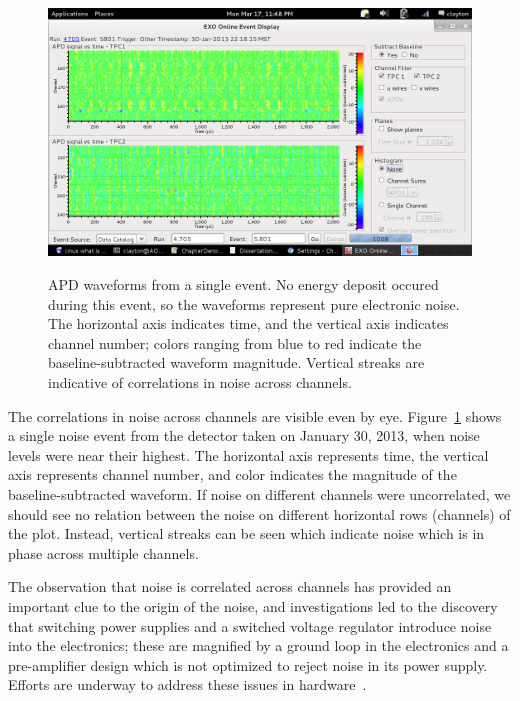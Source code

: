 \begin{figure}
\begin{center}
\includegraphics[keepaspectratio=true,width=\textwidth,clip=true,trim=1mm 21mm 91mm 24mm]{Run4705Ev5801_noiseEventDisplay.png}
\end{center}
\renewcommand{\baselinestretch}{1}
\small\normalsize
\begin{quote}
\caption{APD waveforms from a single event.  No energy deposit occured during this event, so the waveforms represent pure electronic noise.  The horizontal axis indicates time, and the vertical axis indicates channel number; colors ranging from blue to red indicate the baseline-subtracted waveform magnitude.  Vertical streaks are indicative of correlations in noise across channels.}
\label{fig:EvtDisplay_APDNoise}
\end{quote}
\end{figure}
\renewcommand{\baselinestretch}{2}
\small\normalsize

The correlations in noise across channels are visible even by eye.  Figure~\ref{fig:EvtDisplay_APDNoise} shows a single noise event from the detector taken on January 30, 2013, when noise levels were near their highest.  The horizontal axis represents time, the vertical axis represents channel number, and color indicates the magnitude of the baseline-subtracted waveform.  If noise on different channels were uncorrelated, we should see no relation between the noise on different horizontal rows (channels) of the plot.  Instead, vertical streaks can be seen which indicate noise which is in phase across multiple channels.

The observation that noise is correlated across channels has provided an important clue to the origin of the noise, and investigations led to the discovery that switching power supplies and a switched voltage regulator introduce noise into the electronics; these are magnified by a ground loop in the electronics and a pre-amplifier design which is not optimized to reject noise in its power supply.  Efforts are underway to address these issues in hardware~\cite{ElectronicsUpgradeReport_Dec2013,ElectronicsUpgradeReport_March2014}.

